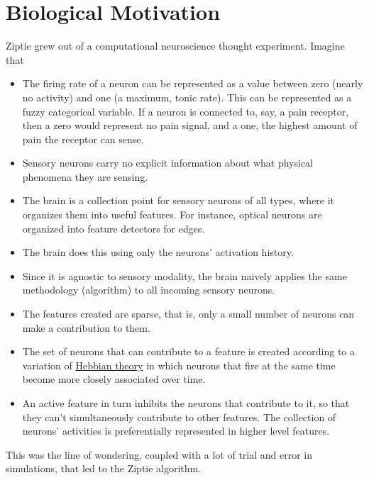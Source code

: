 \section{Biological Motivation}
\label{sec:bio}

Ziptie grew out of a computational neuroscience thought experiment.
Imagine that 

\begin{itemize}
\item{
The firing rate of a neuron can be represented as a value between
zero (nearly no activity) and one (a maximum, tonic rate).
This can be represented as a fuzzy categorical variable.
If a neuron is connected to, say, a pain receptor, then a zero
would represent no pain signal, and a one, the highest amount
of pain the receptor can sense.
}
\item{
Sensory neurons carry no explicit
information about what physical phenomena
they are sensing.
}
\item{
The brain is a collection point for sensory neurons of all types,
where it organizes them into useful features. For instance, optical
neurons are organized into feature detectors for edges.
}
\item{
The brain does this using only the neurons' activation history.
}
\item{
Since it is agnostic to sensory modality, the brain naively applies
the same methodology (algorithm) to all incoming sensory neurons.
}
\item{
The features created are sparse, that is, only a small number of
neurons can make a contribution to them. 
}
\item{
The set of neurons that can contribute to a feature
is created according to a variation of
\href{https://en.wikipedia.org/wiki/Hebbian_theory}{Hebbian theory}
in which neurons that fire at the same time become more closely 
associated over time.
}
\item{
An active feature in turn inhibits the neurons that contribute to it,
so that they can't simultaneously contribute to other features.
The collection of neurons' activities is preferentially represented
in higher level features.
}
\end{itemize}

This was the line of wondering, coupled with a lot of trial and error
in simulations, that led to the Ziptie algorithm.
